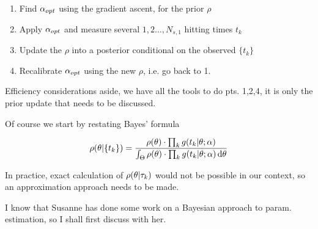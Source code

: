 \begin{enumerate}
  \item Find ${\alpha_{opt} }$ using the gradient ascent, for the prior $\rho$
  \item Apply ${\alpha_{opt} }$ and measure several $1,2\ldots,N_{s,1}$ hitting times
  $t_k$
  \item Update the $\rho$ into a posterior conditional on the observed $\{t_k\}$
  \item Recalibrate ${\alpha_{opt} }$ using the new $\rho$, i.e. go back to 1. 
\end{enumerate}

 Efficiency considerations aside, we have all the tools to do pts. 1,2,4, it
 is only the prior update that needs to be discussed. 

Of course we start by restating Bayes' formula

$$
\rho({ \theta}| \{t_k\} ) = 
\frac{  \rho({ \theta}) \cdot \prod_k g(t_k|{ \theta} ; \alpha) }
	 { \int_{\Theta}  \rho({ \theta}) \cdot \prod_k g(t_k|{ \theta} ; \alpha)  \, \mathrm{d} { \theta}}
$$

In practice, exact calculation of $\rho({ \theta}|{\tau}_k)$ would not be possible in our
context, so an approximation approach needs to be made.

I know that Susanne has done some work on a Bayesian approach to param.
estimation, so I shall first discuss with her. 

\clearpage